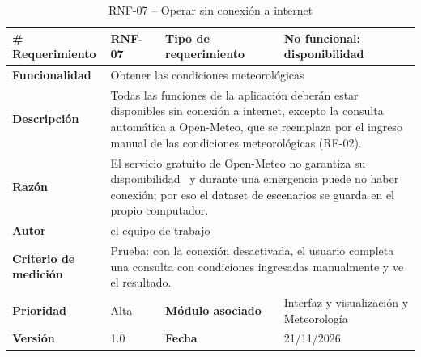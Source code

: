 \begin{longtable}{|p{\rqA}|p{\rqB}|p{\rqC}|p{\rqD}|}
  \caption{RNF-07 -- Operar sin conexión a internet}\label{tab:rnf-07}\tabularnewline
  \hline
  \textbf{\# Requerimiento} & RNF-07 & \raggedright\textbf{Tipo de requerimiento} & No funcional: disponibilidad\tabularnewline\hline
  \raggedright\textbf{Funcionalidad} & \multicolumn{3}{p{\rqBCD}|}{Obtener las condiciones meteorológicas}\tabularnewline\hline
  \endfirsthead
  \textbf{Descripción} & \multicolumn{3}{p{\rqBCD}|}{Todas las funciones de la aplicación deberán estar disponibles sin conexión a internet, excepto la consulta automática a Open-Meteo, que se reemplaza por el ingreso manual de las condiciones meteorológicas (RF-02).}\tabularnewline\hline
  \textbf{Razón} & \multicolumn{3}{p{\rqBCD}|}{El servicio gratuito de Open-Meteo no garantiza su disponibilidad~\cite{openmeteoterms} y durante una emergencia puede no haber conexión; por eso \textcolor{black}{el dataset de escenarios} se guarda en el propio computador.}\tabularnewline\hline
  \textbf{Autor} & \multicolumn{3}{p{\rqBCD}|}{el equipo de trabajo}\tabularnewline\hline
  \raggedright\textbf{Criterio de medición} & \multicolumn{3}{p{\rqBCD}|}{Prueba: con la conexión desactivada, el usuario completa una consulta con condiciones ingresadas manualmente y ve el resultado.}\tabularnewline\hline
  \textbf{Prioridad} & Alta & \raggedright\textbf{Módulo asociado} & Interfaz y visualización y Meteorología\tabularnewline\hline
  \textbf{Versión} & 1.0 & \textbf{Fecha} & 21/11/2026\tabularnewline\hline
\end{longtable}